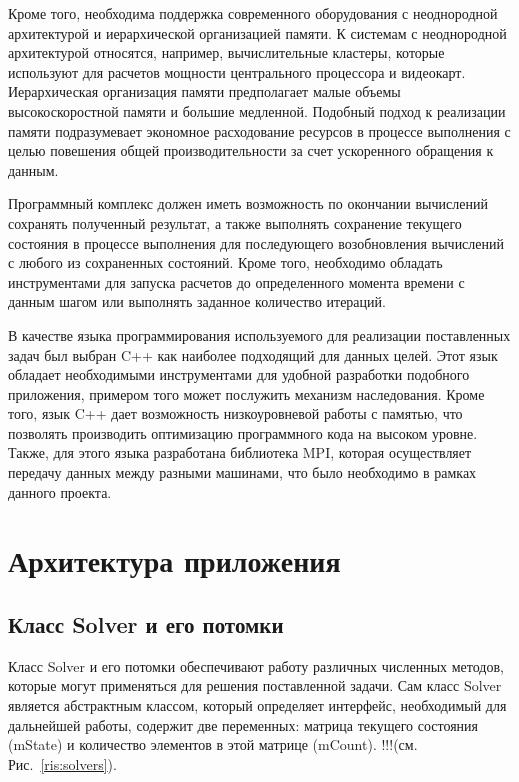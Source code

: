 \documentclass[a4paper, 14pt]{article}
\theoremstyle{definition}
\begin{document}
\par Кроме того, необходима поддержка современного оборудования с неоднородной архитектурой и иерархической организацией памяти. К системам с неоднородной архитектурой относятся, например, вычислительные кластеры, которые используют для расчетов мощности центрального процессора и видеокарт. Иерархическая организация памяти предполагает малые объемы высокоскоростной памяти и большие медленной. Подобный подход к реализации памяти подразумевает экономное расходование ресурсов в процессе выполнения с целью повешения общей производительности за счет ускоренного обращения к данным.

\par Программный комплекс должен иметь возможность по окончании вычислений сохранять полученный результат, а также выполнять сохранение текущего состояния в процессе выполнения для последующего возобновления вычислений с любого из сохраненных состояний. Кроме того, необходимо обладать инструментами для запуска расчетов до определенного момента времени с данным шагом или выполнять заданное количество итераций.

\par В качестве языка программирования используемого для реализации поставленных задач был выбран C++ как наиболее подходящий для данных целей. Этот язык обладает необходимыми инструментами для удобной разработки подобного приложения, примером того может послужить механизм наследования. Кроме того, язык C++ дает возможность низкоуровневой работы с памятью, что позволять производить оптимизацию программного кода на высоком уровне. Также, для этого языка разработана библиотека MPI, которая осуществляет передачу данных между разными машинами, что было необходимо в рамках данного проекта.

\newpage
\section{Архитектура приложения}

\subsection{Класс Solver и его потомки}

\par Класс Solver и его потомки обеспечивают работу различных численных методов, которые могут применяться для решения поставленной задачи. Сам класс Solver является абстрактным классом, который определяет интерфейс, необходимый для дальнейшей работы, содержит две переменных: матрица текущего состояния (mState) и количество элементов в этой матрице (mCount). !!!(см. Рис.~\ref{ris:solvers}).
\end{document}
